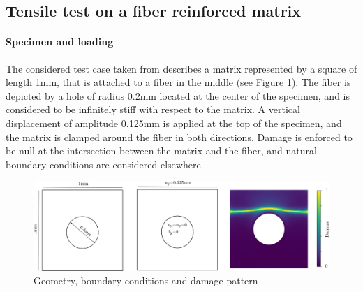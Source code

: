 
\subsection{Tensile test on a fiber reinforced matrix}


\paragraph{Specimen and loading}

The considered test case taken from \cite{bourdin_numerical_2000} describes a matrix represented by a square of length 1mm,
that is attached to a fiber in the middle (see Figure \ref{fig:micromorphic_formulation:matrix_fiber}).
The fiber is depicted by a hole
of radius 0.2mm located at the center of the specimen, and is considered to be infinitely stiff with
respect to the matrix.
A vertical displacement of amplitude 0.125mm is applied at the top of the specimen, and the
matrix is clamped around the fiber in both directions.
Damage is enforced to be null at the intersection between the matrix and the fiber, and natural
boundary conditions are considered elsewhere.

\begin{figure}[H]
    \centering
    \includegraphics[width=14.cm]{../chapter_003_ef_micromorphic/drawings/matrix_mesh.png}
    \caption{Geometry, boundary conditions and damage pattern}
    \label{fig:micromorphic_formulation:matrix_fiber}
\end{figure}

